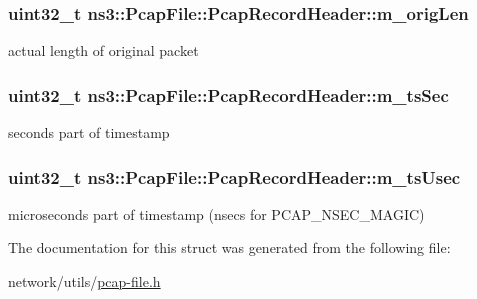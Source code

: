 \subsubsection[{\texorpdfstring{m\+\_\+orig\+Len}{m_origLen}}]{\setlength{\rightskip}{0pt plus 5cm}uint32\+\_\+t ns3\+::\+Pcap\+File\+::\+Pcap\+Record\+Header\+::m\+\_\+orig\+Len}\hypertarget{structns3_1_1PcapFile_1_1PcapRecordHeader_afc413b89d342ae4c9869084e4f51b3cd}{}\label{structns3_1_1PcapFile_1_1PcapRecordHeader_afc413b89d342ae4c9869084e4f51b3cd}
actual length of original packet 
\subsubsection[{\texorpdfstring{m\+\_\+ts\+Sec}{m_tsSec}}]{\setlength{\rightskip}{0pt plus 5cm}uint32\+\_\+t ns3\+::\+Pcap\+File\+::\+Pcap\+Record\+Header\+::m\+\_\+ts\+Sec}\hypertarget{structns3_1_1PcapFile_1_1PcapRecordHeader_a47ce88ffb1bcdf9ee9719722399c7170}{}\label{structns3_1_1PcapFile_1_1PcapRecordHeader_a47ce88ffb1bcdf9ee9719722399c7170}
seconds part of timestamp 
\subsubsection[{\texorpdfstring{m\+\_\+ts\+Usec}{m_tsUsec}}]{\setlength{\rightskip}{0pt plus 5cm}uint32\+\_\+t ns3\+::\+Pcap\+File\+::\+Pcap\+Record\+Header\+::m\+\_\+ts\+Usec}\hypertarget{structns3_1_1PcapFile_1_1PcapRecordHeader_a2b3490eacd3021c1a38b81e1c09de9ce}{}\label{structns3_1_1PcapFile_1_1PcapRecordHeader_a2b3490eacd3021c1a38b81e1c09de9ce}
microseconds part of timestamp (nsecs for P\+C\+A\+P\+\_\+\+N\+S\+E\+C\+\_\+\+M\+A\+G\+IC) 

The documentation for this struct was generated from the following file\+:\begin{DoxyCompactItemize}
\item 
network/utils/\hyperlink{pcap-file_8h}{pcap-\/file.\+h}\end{DoxyCompactItemize}
